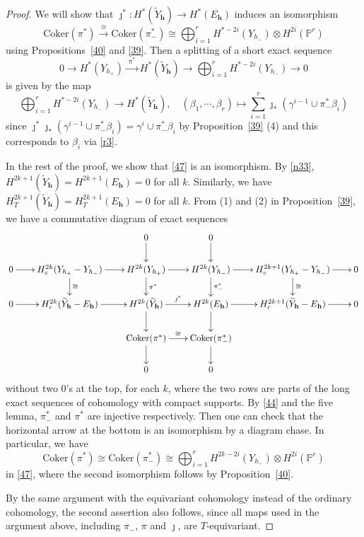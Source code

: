 \documentclass[11pt]{article}
\theoremstyle{definition}
\numberwithin{equation}{section}
\numberwithin{equation}{section}
\newcommand{\PP}{\mathbb{P}}
\newcommand\tY{{\widetilde{Y}}}
\newcommand\lra{\longrightarrow }
\newcommand\beq{\begin{equation}}
\newcommand\eeq{\end{equation}}
\newcommand\bh{\mathbf{h}}
\begin{document}
\begin{proof}
	We will show that $\jmath^*:H^*(\tY_\bh) \to H^*(E_\bh) $ induces an isomorphism
	\beq\label{47}
	\mathrm{Coker}\left(\pi^*\right)\xrightarrow{~\cong~}\mathrm{Coker}\left(\pi_-^*\right)\cong \bigoplus_{i=1}^rH^{*-2i}(Y_{h_-})\otimes H^{2i}(\PP^r)
	\eeq 
	using Propositions~\ref{40} and \ref{39}.
	Then a splitting of a short exact sequence
	\[0\lra H^*(Y_{h_+})\xrightarrow{\;\pi^*\;} H^*(\tY_\bh)\lra \bigoplus_{i=1}^rH^{*-2i}(Y_{h_-})\lra 0\]
	is given by 	
	the map \[\bigoplus_{i=1}^rH^{*-2i}(Y_{h_-})\lra  H^*(\tY_\bh), \quad (\beta_1,\cdots,\beta_r)\mapsto \sum_{i=1}^r \jmath_*\left(\gamma^{i-1}\cup \pi_-^*\beta_i\right)\]
	since 
	$\jmath^*\jmath_*\left(\gamma^{i-1}\cup \pi_-^*\beta_i\right)=\gamma^{i}\cup\pi_-^*\beta_i$
	by Proposition~\ref{39} (4) and this corresponds to $\beta_i$ via \eqref{r3}.

	

	In the rest of the proof, we show that \eqref{47} is an isomorphism.
	By \eqref{n33},  $H^{2k+1}(\tY_\bh)=H^{2k+1}(E_\bh)=0$ for all $k$. 
	Similarly, we have $H^{2k+1}_T(\tY_\bh)=H^{2k+1}_T(E_\bh)=0$ for all $k$.
	From (1) 
	and (2)
	in Proposition~\ref{39},
	we have a commutative diagram of exact sequences 
	\small
\beq \label{7}\xymatrix@C-=0.7cm@R-=0.7cm{ 
&&0\ar[d] &0\ar[d]\\
0\ar[r] &H^{2k}_c(Y_{h_+}-Y_{h_-})\ar[r] \ar[d]^-{\cong }& H^{2k}(Y_{h_+}) \ar[r]\ar[d]^-{\pi^*} & H^{2k}(Y_{h_-}) \ar[r]\ar[d]^-{\pi_-^*}& H^{2k+1}_c(Y_{h_+}-Y_{h_-})\ar[d]^-{\cong }\ar[r] &0 \\ 
0\ar[r] &H^{2k}_c(\tY_{\bh}-E_{\bh}) \ar[r] & H^{2k}(\tY_{\bh}) \ar[r]^-{\jmath^*} \ar[d] & H^{2k}(E_{\bh}) \ar[r]\ar[d] & H^{2k+1}_c(\tY_{\bh}-E_{\bh})\ar[r] &0\\ 
&& \mathrm{Coker}(\pi^*)  \ar[r]^-{\cong }\ar[d] & \mathrm{Coker}(\pi_-^*)\ar[d]\\ 
&& 0 & 0
}\eeq
\normalsize
without two 0's at the top,
for each $k$,  where the two rows are parts of the long exact sequences of cohomology with compact supports. 
By \eqref{44} and the five lemma, $\pi_-^*$ and $\pi^*$ are injective respectively. Then one can check that the horizontal arrow at the bottom is an isomorphism by a diagram chase.
In particular, we have
\[\mathrm{Coker}(\pi^*)\cong \mathrm{Coker}(\pi_-^*)\cong \bigoplus_{i=1}^rH^{2k-2i}(Y_{h_-})\otimes H^{2i}(\PP^r) \] 
in \eqref{47}, where the second isomorphism follows by Proposition~\ref{40}.




By the same argument with the equivariant cohomology instead of the ordinary cohomology, the second assertion also follows, since all maps used in the argument above, including $\pi_-$, $\pi$ and $\jmath$, are $T$-equivariant.
\end{proof}
\end{document}
